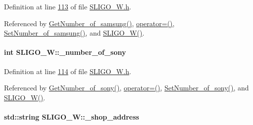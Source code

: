 Definition at line \hyperlink{_s_l_i_g_o___w_8h_source_l00113}{113} of file \hyperlink{_s_l_i_g_o___w_8h_source}{S\+L\+I\+G\+O\+\_\+\+W.\+h}.



Referenced by \hyperlink{_s_l_i_g_o___w_8cpp_source_l00105}{Get\+Number\+\_\+of\+\_\+samsung()}, \hyperlink{_s_l_i_g_o___w_8h_source_l00075}{operator=()}, \hyperlink{_s_l_i_g_o___w_8cpp_source_l00101}{Set\+Number\+\_\+of\+\_\+samsung()}, and \hyperlink{_s_l_i_g_o___w_8h_source_l00024}{S\+L\+I\+G\+O\+\_\+\+W()}.

\paragraph[{\texorpdfstring{\+\_\+number\+\_\+of\+\_\+sony}{_number_of_sony}}]{\setlength{\rightskip}{0pt plus 5cm}int S\+L\+I\+G\+O\+\_\+\+W\+::\+\_\+number\+\_\+of\+\_\+sony\hspace{0.3cm}{\ttfamily [private]}}\hypertarget{class_s_l_i_g_o___w_a0ccf87fe78352e1eac98ed3c85810caa_a0ccf87fe78352e1eac98ed3c85810caa}{}\label{class_s_l_i_g_o___w_a0ccf87fe78352e1eac98ed3c85810caa_a0ccf87fe78352e1eac98ed3c85810caa}


Definition at line \hyperlink{_s_l_i_g_o___w_8h_source_l00114}{114} of file \hyperlink{_s_l_i_g_o___w_8h_source}{S\+L\+I\+G\+O\+\_\+\+W.\+h}.



Referenced by \hyperlink{_s_l_i_g_o___w_8cpp_source_l00097}{Get\+Number\+\_\+of\+\_\+sony()}, \hyperlink{_s_l_i_g_o___w_8h_source_l00075}{operator=()}, \hyperlink{_s_l_i_g_o___w_8cpp_source_l00093}{Set\+Number\+\_\+of\+\_\+sony()}, and \hyperlink{_s_l_i_g_o___w_8h_source_l00024}{S\+L\+I\+G\+O\+\_\+\+W()}.

\paragraph[{\texorpdfstring{\+\_\+shop\+\_\+address}{_shop_address}}]{\setlength{\rightskip}{0pt plus 5cm}std\+::string S\+L\+I\+G\+O\+\_\+\+W\+::\+\_\+shop\+\_\+address\hspace{0.3cm}{\ttfamily [private]}}\hypertarget{class_s_l_i_g_o___w_ade08b79101c67997dde54515f2088b9d_ade08b79101c67997dde54515f2088b9d}{}\label{class_s_l_i_g_o___w_ade08b79101c67997dde54515f2088b9d_ade08b79101c67997dde54515f2088b9d}


